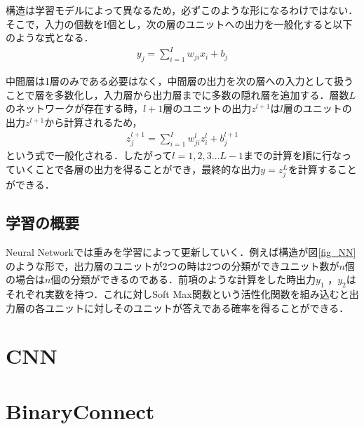 構造は学習モデルによって異なるため，必ずこのような形になるわけではない．そこで，入力の個数をI個とし，次の層のユニットへの出力を一般化すると以下のような式となる．
\begin{align*}
y_j = \sum^{I}_{i = 1} w_{ji}x_i + b_j
\end{align*}

中間層は1層のみである必要はなく，中間層の出力を次の層への入力として扱うことで層を多数化し，入力層から出力層までに多数の隠れ層を追加する．層数$L$のネットワークが存在する時，$l+1$層のユニットの出力$z^{l+1}$は$l$層のユニットの出力$z^{l+1}$から計算されるため，
\begin{align*}
  z^{l+1}_j = \sum^{I}_{i = 1} w^{l}_{ji}z^l_i + b^{l+1}_j
\end{align*}
という式で一般化される．したがって$l=1,2,3\ldots L-1$までの計算を順に行なっていくことで各層の出力を得ることができ，最終的な出力$y=z^L_j$を計算することができる．

\subsection{学習の概要}
Neural Networkでは重みを学習によって更新していく．例えば構造が図\ref{fig_NN}のような形で，出力層のユニットが2つの時は2つの分類ができユニット数が$n$個の場合は$n$個の分類ができるのである．前項のような計算をした時出力$y_1$ ，$y_2$はそれぞれ実数を持つ．これに対しSoft Max関数という活性化関数を組み込むと出力層の各ユニットに対しそのユニットが答えである確率を得ることができる．


\section{CNN}

\section{BinaryConnect}

